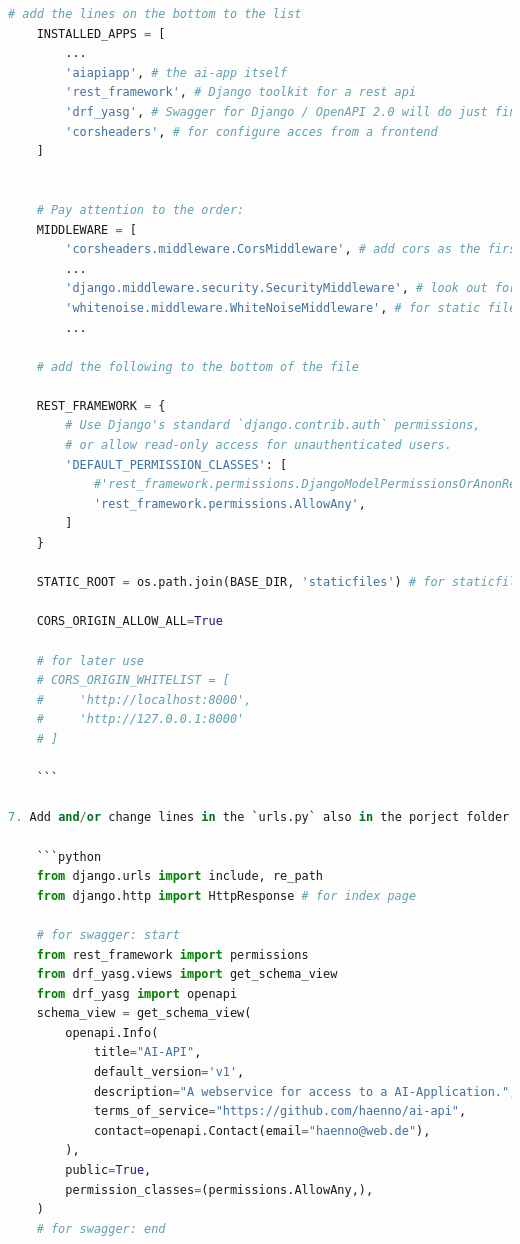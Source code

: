 \documentclass[12pt,oneside,titlepage,listof=totoc,bibliography=totoc]{scrartcl}
\begin{document}
\begin{appendices}
\begin{lstlisting}[language=python,numbers=none]
    # add the lines on the bottom to the list
    INSTALLED_APPS = [
        ...
        'aiapiapp', # the ai-app itself
        'rest_framework', # Django toolkit for a rest api
        'drf_yasg', # Swagger for Django / OpenAPI 2.0 will do just fine
        'corsheaders', # for configure acces from a frontend
    ]


    # Pay attention to the order:
    MIDDLEWARE = [
        'corsheaders.middleware.CorsMiddleware', # add cors as the first line
        ...
        'django.middleware.security.SecurityMiddleware', # look out for this line and insert whitenoise below
        'whitenoise.middleware.WhiteNoiseMiddleware', # for static files
        ...

    # add the following to the bottom of the file

    REST_FRAMEWORK = {
        # Use Django's standard `django.contrib.auth` permissions,
        # or allow read-only access for unauthenticated users.
        'DEFAULT_PERMISSION_CLASSES': [
            #'rest_framework.permissions.DjangoModelPermissionsOrAnonReadOnly', # for later use
            'rest_framework.permissions.AllowAny',
        ]
    }

    STATIC_ROOT = os.path.join(BASE_DIR, 'staticfiles') # for staticfiles

    CORS_ORIGIN_ALLOW_ALL=True

    # for later use
    # CORS_ORIGIN_WHITELIST = [
    #     'http://localhost:8000',
    #     'http://127.0.0.1:8000'
    # ]

    ```

7. Add and/or change lines in the `urls.py` also in the porject folder `aiapiproject`:

    ```python
    from django.urls import include, re_path
    from django.http import HttpResponse # for index page

    # for swagger: start
    from rest_framework import permissions
    from drf_yasg.views import get_schema_view
    from drf_yasg import openapi
    schema_view = get_schema_view(
        openapi.Info(
            title="AI-API",
            default_version='v1',
            description="A webservice for access to a AI-Application.",
            terms_of_service="https://github.com/haenno/ai-api",
            contact=openapi.Contact(email="haenno@web.de"),
        ),
        public=True,
        permission_classes=(permissions.AllowAny,),
    )
    # for swagger: end


\end{lstlisting}
\end{appendices}
\end{document}

